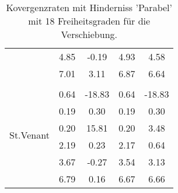 \begin{table}
\begin{tabular}{c|cc|cc|}
\multicolumn{1}{|c|}{} & \multicolumn{1}{|c|}{      4.85} & \multicolumn{1}{|c|}{     -0.19} & \multicolumn{1}{|c|}{      4.93} & \multicolumn{1}{|c|}{      4.58} \\ 
\multicolumn{1}{|c|}{} & \multicolumn{1}{|c|}{      7.01} & \multicolumn{1}{|c|}{      3.11} & \multicolumn{1}{|c|}{      6.87} & \multicolumn{1}{|c|}{      6.64} \\ 
\hline 
\multicolumn{1}{|c|}{\multirow{7}{*}{St.Venant}} &\multicolumn{1}{|c|}{} & \multicolumn{1}{|c|}{} & \multicolumn{1}{|c|}{} & \multicolumn{1}{|c|}{} \\ 
\multicolumn{1}{|c|}{} & \multicolumn{1}{|c|}{      0.64} & \multicolumn{1}{|c|}{    -18.83} & \multicolumn{1}{|c|}{      0.64} & \multicolumn{1}{|c|}{    -18.83} \\ 
\multicolumn{1}{|c|}{} & \multicolumn{1}{|c|}{      0.19} & \multicolumn{1}{|c|}{      0.30} & \multicolumn{1}{|c|}{      0.19} & \multicolumn{1}{|c|}{      0.30} \\ 
\multicolumn{1}{|c|}{} & \multicolumn{1}{|c|}{      0.20} & \multicolumn{1}{|c|}{     15.81} & \multicolumn{1}{|c|}{      0.20} & \multicolumn{1}{|c|}{      3.48} \\ 
\multicolumn{1}{|c|}{} & \multicolumn{1}{|c|}{      2.19} & \multicolumn{1}{|c|}{      0.23} & \multicolumn{1}{|c|}{      2.17} & \multicolumn{1}{|c|}{      0.64} \\ 
\multicolumn{1}{|c|}{} & \multicolumn{1}{|c|}{      3.67} & \multicolumn{1}{|c|}{     -0.27} & \multicolumn{1}{|c|}{      3.54} & \multicolumn{1}{|c|}{      3.13} \\ 
\multicolumn{1}{|c|}{} & \multicolumn{1}{|c|}{      6.79} & \multicolumn{1}{|c|}{      0.16} & \multicolumn{1}{|c|}{      6.67} & \multicolumn{1}{|c|}{      6.66} \\ 
\hline 
\end{tabular}\caption{Kovergenzraten mit Hinderniss 'Parabel' mit 18 Freiheitsgraden für die Verschiebung.}\label{tab:Rate_Parabel_level0}
\end{table} 
